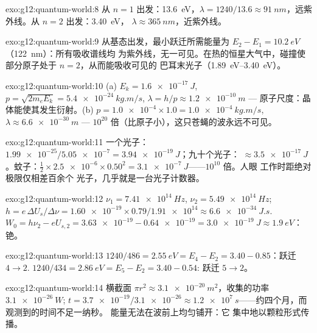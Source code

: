 \begin{solution}{exo:g12:quantum-world:8}
从 $n = 1$ 出发：\qty{13.6}{eV}，$\lambda = 1240/13.6 \approx
\qty{91}{nm}$，远紫外线。从 $n = 2$ 出发：\qty{3.40}{eV}，
$\lambda \approx \qty{365}{nm}$，近紫外线。
\end{solution}

\begin{solution}{exo:g12:quantum-world:9}
从基态出发，最小跃迁所需能量为 $E_2 - E_1 =
\qty{10.2}{eV}$（\qty{122}{nm}）：所有吸收谱线均
为紫外线，无一可见。在热的恒星大气中，碰撞使
部分原子处于 $n = 2$，从而能吸收可见的
巴耳末光子（\qtyrange{1.89}{3.40}{eV}）。
\end{solution}

\begin{solution}{exo:g12:quantum-world:10}
(a) $E_k = \qty{1.6e-17}{J}$, $p = \sqrt{2m_e E_k} =
\qty{5.4e-24}{kg.m/s}$, $\lambda = h/p \approx \qty{1.2e-10}{m}$ ---
原子尺度：晶体能使其发生衍射。(b) $p = \num{1.0e-4} \times 1.0 =
\qty{1.0e-4}{kg.m/s}$, $\lambda \approx \qty{6.6e-30}{m}$ --- $10^{20}$
倍（比原子小），这只苍蝇的波永远不可见。
\end{solution}

\begin{solution}{exo:g12:quantum-world:11}
一个光子：$\num{1.99e-25}/\num{5.05e-7} = \qty{3.94e-19}{J}$；九十个光子：
$\approx \qty{3.5e-17}{J}$。蚊子：$\tfrac12 \times \num{2.5e-6}
\times 0.50^2 = \qty{3.1e-7}{J}$——$10^{10}$ 倍。人眼
工作时距绝对极限仅相差百余个
光子，几乎就是一台光子计数器。
\end{solution}

\begin{solution}{exo:g12:quantum-world:12}
$\nu_1 = \qty{7.41e14}{Hz}$, $\nu_2 = \qty{5.49e14}{Hz}$;
$h = e\,\Delta U_s/\Delta\nu = \num{1.60e-19} \times 0.79 /
\num{1.91e14} \approx \qty{6.6e-34}{J.s}$. $W_0 = h\nu_2 - eU_{s,2} =
\num{3.63e-19} - \num{0.64e-19} = \qty{3.0e-19}{J} \approx
\qty{1.9}{eV}$：铯。
\end{solution}

\begin{solution}{exo:g12:quantum-world:13}
$1240/486 = \qty{2.55}{eV} = E_4 - E_2 = 3.40 - 0.85$：跃迁
$4 \to 2$. $1240/434 = \qty{2.86}{eV} = E_5 - E_2 = 3.40 - 0.54$:
跃迁 $5 \to 2$。
\end{solution}

\begin{solution}{exo:g12:quantum-world:14}
横截面 $\pi r^2 \approx \qty{3.1e-20}{m^2}$，收集的功率
$\qty{3.1e-26}{W}$; $t = \num{3.7e-19}/\num{3.1e-26} \approx
\qty{1.2e7}{s}$——约四个月，而观测到的时间不足一纳秒。
能量无法在波前上均匀铺开：它
集中地以颗粒形式传播。
\end{solution}


